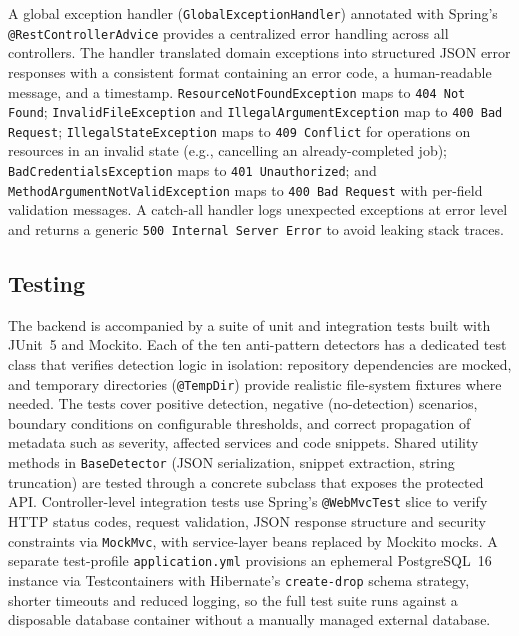  \par A global exception handler (\texttt{GlobalExceptionHandler}) annotated with Spring's \texttt{@RestControllerAdvice} provides a centralized error handling across all controllers. The handler translated domain exceptions into structured JSON error responses with a consistent format containing an error code, a human-readable message, and a timestamp. \texttt{ResourceNotFoundException} maps to \texttt{404 Not Found}; \texttt{InvalidFileException} and \texttt{IllegalArgumentException} map to \texttt{400 Bad Request}; \texttt{IllegalStateException} maps to \texttt{409 Conflict} for operations on resources in an invalid state (e.g., cancelling an already-completed job); \texttt{Bad\-Cre\-den\-tialsEx\-cep\-tion} maps to \texttt{401 Unauthorized}; and \texttt{Me\-thodAr\-gu\-mentNotVa\-lidEx\-ception} maps to \texttt{400 Bad Request} with per-field validation messages. A catch-all handler logs unexpected exceptions at error level and returns a generic \texttt{500 Internal Server Error} to avoid leaking stack traces.

\subsection{Testing}
\label{subsec:testing}

\par The backend is accompanied by a suite of unit and integration tests built with JUnit~5 and Mockito. Each of the ten anti-pattern detectors has a dedicated test class that verifies detection logic in isolation: repository dependencies are mocked, and temporary directories (\texttt{@TempDir}) provide realistic file-system fixtures where needed. The tests cover positive detection, negative (no-detection) scenarios, boundary conditions on configurable thresholds, and correct propagation of metadata such as severity, affected services and code snippets. Shared utility methods in \texttt{BaseDetector} (JSON serialization, snippet extraction, string truncation) are tested through a concrete subclass that exposes the protected API. Controller-level integration tests use Spring's \texttt{@WebMvcTest} slice to verify HTTP status codes, request validation, JSON response structure and security constraints via \texttt{MockMvc}, with service-layer beans replaced by Mockito mocks. A separate test-profile \texttt{application.yml} provisions an ephemeral PostgreSQL~16 instance via Testcontainers with Hibernate's \texttt{create-drop} schema strategy, shorter timeouts and reduced logging, so the full test suite runs against a disposable database container without a manually managed external database.


